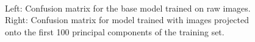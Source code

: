 \documentclass{article}[12 pt]
\begin{document}
\begin{figure}[!ht]
	\centering
	\quad
	\\
	\caption{Left: Confusion matrix for the base model trained on raw images. Right: Confusion matrix for model trained with images projected onto the first 100 principal components of the training set.}
	\label{fig:base_confusion_mats}
\end{figure}


\noindent

 
\end{document}
